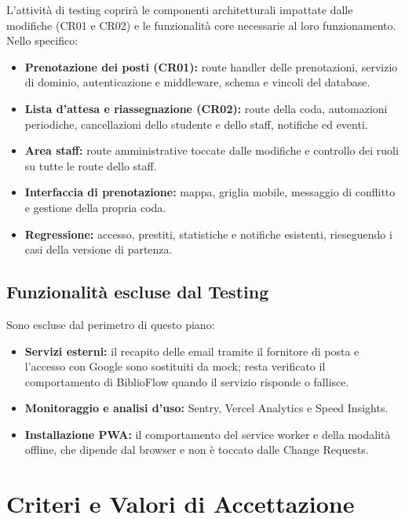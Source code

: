 \documentclass[11pt,a4paper,oneside,openany]{book}
\begin{document}
L'attività di testing coprirà le componenti architetturali impattate dalle
modifiche (CR01 e CR02) e le funzionalità core necessarie al loro
funzionamento. Nello specifico:
\begin{itemize}
  \item \textbf{Prenotazione dei posti (CR01):} route handler delle
        prenotazioni, servizio di dominio, autenticazione e middleware, schema
        e vincoli del database.
  \item \textbf{Lista d'attesa e riassegnazione (CR02):} route della coda,
        automazioni periodiche, cancellazioni dello studente e dello staff,
        notifiche ed eventi.
  \item \textbf{Area staff:} route amministrative toccate dalle modifiche e
        controllo dei ruoli su tutte le route dello staff.
  \item \textbf{Interfaccia di prenotazione:} mappa, griglia mobile, messaggio
        di conflitto e gestione della propria coda.
  \item \textbf{Regressione:} accesso, prestiti, statistiche e notifiche
        esistenti, rieseguendo i casi della versione di partenza.
\end{itemize}

\subsection{Funzionalità escluse dal Testing}

Sono escluse dal perimetro di questo piano:
\begin{itemize}
  \item \textbf{Servizi esterni:} il recapito delle email tramite il
        fornitore di posta e l'accesso con Google sono sostituiti da mock;
        resta verificato il comportamento di BiblioFlow quando il servizio
        risponde o fallisce.
  \item \textbf{Monitoraggio e analisi d'uso:} Sentry, Vercel Analytics e
        Speed Insights.
  \item \textbf{Installazione PWA:} il comportamento del service worker e
        della modalità offline, che dipende dal browser e non è toccato dalle
        Change Requests.
\end{itemize}

\section{Criteri e Valori di Accettazione}
\end{document}
